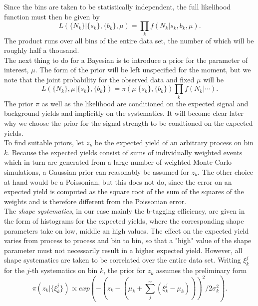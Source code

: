 \documentclass[aps,prb,twocolumn,showpacs,superscriptaddress,groupedaddress]{revtex4}  %
\begin{document}
Since the bins are taken to be statistically independent, the full likelihood function must then be given by
\begin{equation}\label{eq:likelihood}
L(\{N_{k}\}|\{s_{k}\},\{b_{k}\},\mu)=\prod\limits_{k}f(N_{k}|s_{k},b_{k},\mu).
\end{equation}
The product runs over all bins of the entire data set, the number of which will be roughly half a thousand.\\
The next thing to do for a Bayesian is to introduce a prior for the parameter of interest, $\mu$. The form of the prior will be left unspecified for the moment, but we note that the joint probability for the observed data and fixed $\mu$ will be
\begin{equation*}
L(\{N_{k}\},\mu|\{s_{k}\},\{b_{k}\})=\pi(\mu|\{s_{k}\},\{b_{k}\})\prod\limits_{k}f(N_{k}|\dotsi).
\end{equation*}
The prior $\pi$ as well as the likelihood are conditioned on the expected signal and background yields and impli\-citly on the systematics. It will become clear later why we choose the prior for the signal strength to be condtioned on the expected yields.\\
To find suitable priors, let $z_{k}$ be the expected yield of an arbitrary process on bin $k$. Because the expected yields consist of sums of individually weighted events which in turn are generated from a large number of weighted Monte-Carlo simulations, a Gaussian prior can reasonably be assumed for $z_{k}$. The other choice at hand would be a Poissonian, but this does not do, since the error on an expected yield is computed as the square root of the sum of the squares of the weights and is therefore different from the Poissonian error.\\
The \emph{shape systematics}, in our case mainly the b-tagging efficiency, are given in the form of histograms for the expected yields, where the corresponding shape parameters take on low, middle an high values. The effect on the expected yield varies from process to process and bin to bin, so that a "high" value of the shape parameter must not necessarily result in a higher expected yield. However, all shape systematics are taken to be correlated over the entire data set. Writing $\xi_{k}^{j}$ for the $j$-th systematics on bin $k$, the prior for $z_{k}$ assumes the preliminary form
\begin{equation}
\pi(z_{k}|\{\xi_{k}^{j}\})\propto exp(-(z_{k}-(\mu_{k}+\sum\limits_{j}^{\sim}(\xi_{k}^{j}-\mu_{k})))^{2}/2\sigma_{k}^{2}).
\end{equation}
\end{document}
